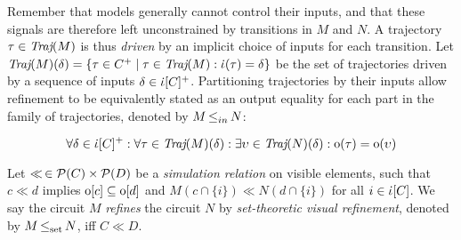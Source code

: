Remember that models generally cannot control their inputs, and that these signals are therefore left unconstrained by transitions in $M$ and $N$. A trajectory $\tau \in \operatorname{\textit{Traj}}(M)$ is thus \textit{driven} by an implicit choice of inputs for each transition. Let $\operatorname{\textit{Traj}}(M)(\delta) = \{ \tau \in C^{+} \mid \tau \in \operatorname{\textit{Traj}}(M) : \dot{\iota}(\tau) = \delta \}$ be the set of trajectories driven by a sequence of inputs $\delta \in \dot{\iota}[C]^{+}$. Partitioning trajectories by their inputs allow refinement to be equivalently stated as an output equality for each part in the family of trajectories, denoted by $M \operatorname{\leq}_{in} N$:

\begin{equation*}
\forall \delta \in \dot{\iota}[C]^{+} : \forall \tau \in \operatorname{\textit{Traj}}(M)(\delta) : \exists \upsilon \in \operatorname{\textit{Traj}}(N)(\delta) : \mathrm{o}(\tau) = \mathrm{o}(\upsilon)
\end{equation*}

\noindent {}




 Let $\ll \, \in \mathcal{P}(C) \times \mathcal{P}(D)$ be a \textit{simulation relation} on visible elements, such that $c \ll d$ implies $\mathrm{o}[c] \subseteq \mathrm{o}[d]$ and $M(c \cap \{ i \}) \ll N(d \cap \{ i \})$ for all $i \in \dot{\iota}[C]$. We say the circuit $M$ \textit{refines} the circuit $N$ by \textit{set-theoretic visual refinement}, denoted by $M \operatorname{\operatorname{\leq}_{\textrm{set}}} N$, iff $C \ll D$.

